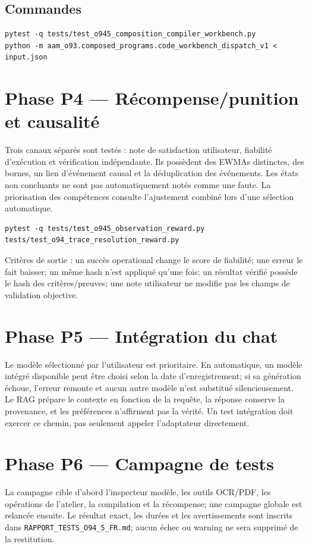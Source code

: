 \documentclass[11pt,a4paper]{article}
\begin{document}
\subsection{Commandes}
\begin{verbatim}
pytest -q tests/test_o945_composition_compiler_workbench.py
python -m aam_o93.composed_programs.code_workbench_dispatch_v1 < input.json
\end{verbatim}

\section{Phase P4 — Récompense/punition et causalité}
Trois canaux séparés sont testés : note de satisfaction utilisateur, fiabilité d'exécution et vérification indépendante. Ils possèdent des EWMAs distinctes, des bornes, un lien d'événement causal et la déduplication des événements. Les états non concluants ne sont pas automatiquement notés comme une faute. La priorisation des compétences consulte l'ajustement combiné lors d'une sélection automatique.

\begin{verbatim}
pytest -q tests/test_o945_observation_reward.py tests/test_o94_trace_resolution_reward.py
\end{verbatim}
Critères de sortie : un succès operational change le score de fiabilité; une erreur le fait baisser; un même hash n'est appliqué qu'une fois; un résultat vérifié possède le hash des critères/preuves; une note utilisateur ne modifie pas les champs de validation objective.

\section{Phase P5 — Intégration du chat}
Le modèle sélectionné par l'utilisateur est prioritaire. En automatique, un modèle intégré disponible peut être choisi selon la date d'enregistrement; si sa génération échoue, l'erreur remonte et aucun autre modèle n'est substitué silencieusement. Le RAG prépare le contexte en fonction de la requête, la réponse conserve la provenance, et les préférences n'affirment pas la vérité. Un test intégration doit exercer ce chemin, pas seulement appeler l'adaptateur directement.

\section{Phase P6 — Campagne de tests}
La campagne cible d'abord l'inspecteur modèle, les outils OCR/PDF, les opérations de l'atelier, la compilation et la récompense; une campagne globale est relancée ensuite. Le résultat exact, les durées et les avertissements sont inscrits dans \texttt{RAPPORT\_TESTS\_O94\_5\_FR.md}; aucun échec ou warning ne sera supprimé de la restitution.
\end{document}
